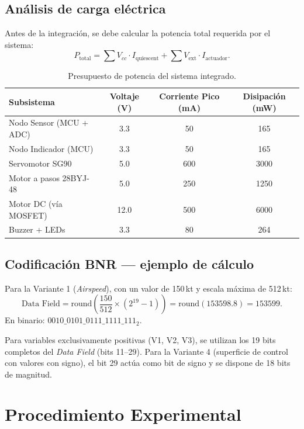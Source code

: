 \documentclass[11pt]{article}
\begin{document}
\subsection{Análisis de carga eléctrica}
Antes de la integración, se debe calcular la potencia total requerida por el sistema:
\begin{equation}
  P_\text{total} = \sum V_{cc}\cdot I_\text{quiescent} + \sum V_\text{ext}\cdot I_\text{actuador}.
\end{equation}
\begin{table}[H]\centering
\caption{Presupuesto de potencia del sistema integrado.}
\begin{tabular}{lccc}
\toprule
Subsistema & Voltaje (V) & Corriente Pico (mA) & Disipación (mW) \\
\midrule
Nodo Sensor (MCU + ADC) & 3.3 & 50 & 165 \\
Nodo Indicador (MCU) & 3.3 & 50 & 165 \\
Servomotor SG90 & 5.0 & 600 & 3000 \\
Motor a pasos 28BYJ-48 & 5.0 & 250 & 1250 \\
Motor DC (vía MOSFET) & 12.0 & 500 & 6000 \\
Buzzer + LEDs & 3.3 & 80 & 264 \\
\bottomrule
\end{tabular}
\end{table}

\subsection{Codificación BNR — ejemplo de cálculo}
Para la Variante 1 (\emph{Airspeed}), con un valor de 150\,kt y escala máxima de
512\,kt:
\begin{equation}
  \text{Data Field} = \text{round}\!\left(\frac{150}{512}\times(2^{19}-1)\right) =
  \text{round}(153598.8) = 153599.
\end{equation}
En binario: $0010\_0101\_0111\_1111\_111_2$.

\begin{nota}
Para variables exclusivamente positivas (V1, V2, V3), se utilizan los 19 bits completos
del \emph{Data Field} (bits 11--29). Para la Variante 4 (superficie de control con
valores con signo), el bit 29 actúa como bit de signo y se dispone de 18 bits de
magnitud.
\end{nota}

\section{Procedimiento Experimental}
\end{document}
